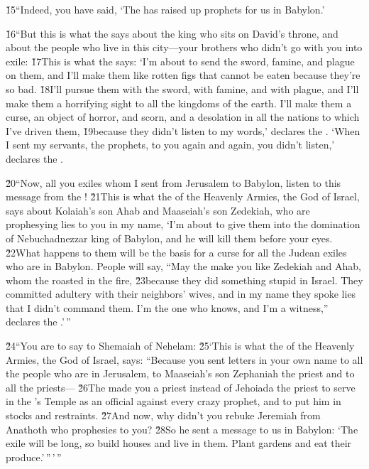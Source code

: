 \v{15}``Indeed, you have said, `The  has raised up prophets for us in Babylon.'

\v{16}``But this is what the  says about the king who sits on David's throne, and about the people who live in this city---your brothers who didn't go with you into exile: \v{17}This is what the  says: `I'm about to send the sword, famine, and plague on them, and I'll make them like rotten figs that cannot be eaten because they're so bad. \v{18}I'll pursue them with the sword, with famine, and with plague, and I'll make them a horrifying sight to all the kingdoms of the earth. I'll make them a curse, an object of horror, and scorn, and a desolation in all the nations to which I've driven them, \v{19}because they didn't listen to my words,' declares the . `When I sent my servants, the prophets, to you again and again, you didn't listen,' declares the .

\v{20}``Now, all you exiles whom I sent from Jerusalem to Babylon, listen to this message from the ! \v{21}This is what the  of the Heavenly Armies, the God of Israel, says about Kolaiah's son Ahab and Maaseiah's son Zedekiah, who are prophesying lies to you in my name, `I'm about to give them into the domination of Nebuchadnezzar king of Babylon, and he will kill them before your eyes. \v{22}What happens to them will be the basis for a curse for all the Judean exiles who are in Babylon. People will say, ``May the  make you like Zedekiah and Ahab, whom the  roasted in the fire, \v{23}because they did something stupid in Israel. They committed adultery with their neighbors' wives, and in my name they spoke lies that I didn't command them. I'm the one who knows, and I'm a witness,'' declares the .'\,''

\v{24}``You are to say to Shemaiah of Nehelam: \v{25}`This is what the  of the Heavenly Armies, the God of Israel, says: ``Because you sent letters in your own name to all the people who are in Jerusalem, to Maaseiah's son Zephaniah the priest and to all the priests--- \v{26}The  made you a priest instead of Jehoiada the priest to serve in the 's Temple as an official against every crazy prophet, and to put him in stocks and restraints. \v{27}And now, why didn't you rebuke Jeremiah from Anathoth who prophesies to you? \v{28}So he sent a message to us in Babylon: `The exile will be long, so build houses and live in them. Plant gardens and eat their produce.'\,''\,'\,''


